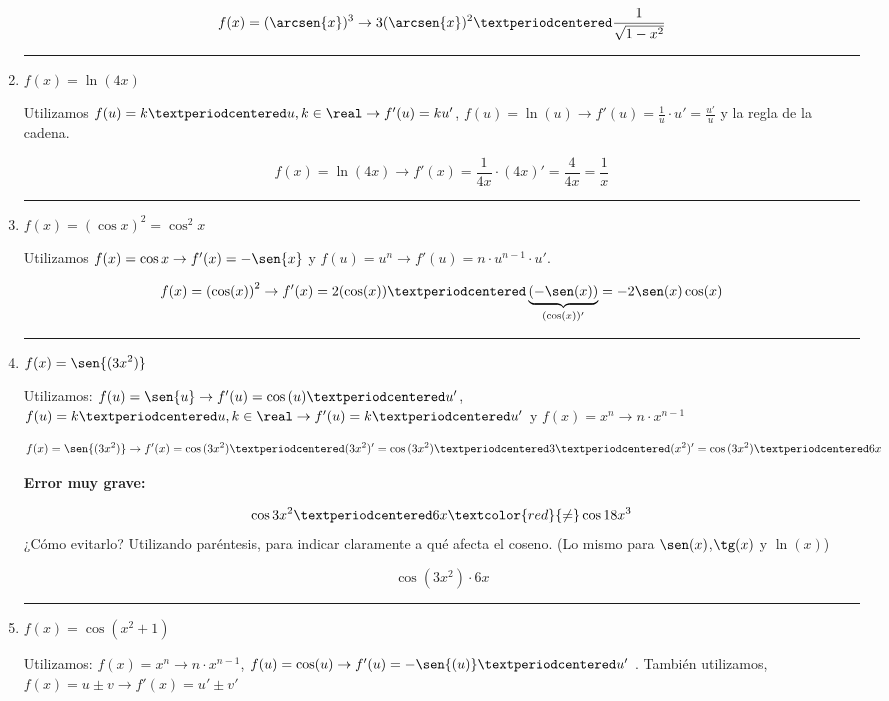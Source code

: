 \documentclass[palatino,nosec,nochap,nobuilddate]{Docencia}
\begin{document}
\begin{enumerate}
\[
f(x) = (\arcsen{x})^3 \to 3(\arcsen{x})^2·\frac{1}{\sqrt{1-x^2}}
\]

\vspace{0.3cm}\hrule\vspace{0.6cm} \item $\displaystyle f(x) = \ln(4x)$

Utilizamos $f(u) = k·u, k\in\real \to f'(u) = ku'$, $f(u) = \ln(u) \to f'(u)= \frac{1}{u}·u' = \frac{u'}{u}$ y la regla de la cadena.

\[
f(x) = \ln(4x) \to f'(x) = \frac{1}{4x}·(4x)' = \frac{4}{4x} = \frac{1}{x}
\]


\vspace{0.3cm}\hrule\vspace{0.6cm} \item $\displaystyle f(x) = (\cos{x})^2 = \cos^2{x}$

Utilizamos $f(x) = \cos{x} \to f'(x) = -\sen{x}$ y $f(u) = u^n \to f'(u) = n·u^{n-1}·u'$.

\[
	f(x) = \left(\cos(x)\right)^2 \to f'(x) = 2(\cos(x))·\underbrace{(-\sen(x))}_{(\cos(x))'} = -2\sen(x)\cos(x)
\]

	



\vspace{0.3cm}\hrule\vspace{0.6cm} \item $\displaystyle f(x) = \sen{(3x^2)}$

Utilizamos: $f(u) = \sen{u} \to f'(u) = \cos{(u)}·u'$, $f(u) = k·u, k\in\real \to f'(u) = k·u'$ y $f(x) = x^n \to n·x^{n-1}$

\[
	f(x) = \sen{(3x^2)} \to f'(x) = \cos{(3x^2)}·(3x^2)' = \cos{(3x^2)}·3·(x^2)' = \cos{(3x^2)}·6x
\]

\textbf{Error muy grave:}

\[
	\cos{3x^2}·6x \textcolor{red}{\neq} \cos{18x^3}
\]
¿Cómo evitarlo? Utilizando paréntesis, para indicar claramente a qué afecta el coseno. (Lo mismo para $\sen(x)$,$\tg(x)$ y $\ln(x)$)

\[
	\cos{\left(3x^2\right)}·6x
\]


\vspace{0.3cm}\hrule\vspace{0.6cm} \item $\displaystyle f(x) = \cos{(x^2+1)} $

Utilizamos: $f(x) = x^n \to n·x^{n-1}$, $f(u) = \cos(u) \to f'(u) = -\sen{(u)}·u'$
. También utilizamos, $f(x) = u \pm v \to f'(x) = u' \pm v'$


\end{enumerate}
\end{document}
